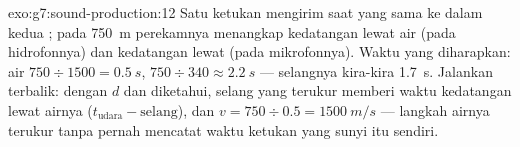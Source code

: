\begin{solution}{exo:g7:sound-production:12}
Satu ketukan mengirim saat yang sama ke dalam kedua ; pada
\qty{750}{m} perekamnya menangkap kedatangan lewat air (pada
hidrofonnya) dan kedatangan lewat  (pada mikrofonnya). Waktu yang
diharapkan: air $750 \div 1500 = \qty{0.5}{s}$,  $750 \div 340
\approx \qty{2.2}{s}$ --- selangnya kira-kira \qty{1.7}{s}. Jalankan
terbalik: dengan $d$ dan   diketahui, selang yang
terukur memberi waktu kedatangan lewat airnya ($t_{\text{udara}} -
\text{selang}$), dan $v = 750 \div 0.5 = \qty{1500}{m/s}$ ---
langkah airnya terukur tanpa pernah mencatat waktu ketukan yang sunyi
itu sendiri.
\end{solution}

